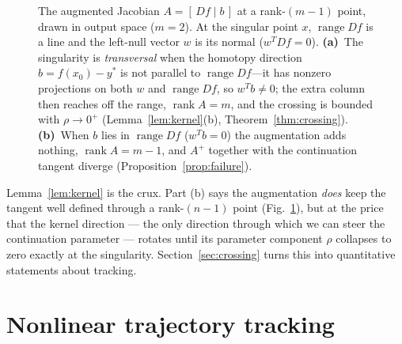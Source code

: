\documentclass[11pt,american]{article}
\DeclareMathOperator{\rank}{\operatorname{rank}}
\DeclareMathOperator{\range}{range}
\theoremstyle{definition}
\theoremstyle{plain}
\theoremstyle{remark}
\begin{document}
\begin{figure}[h]
\begin{tikzpicture}[scale=1.8,line join=round,font=\footnotesize]
\end{tikzpicture}
\caption{The augmented Jacobian $A=[\,Df\mid b\,]$ at a rank-$(m{-}1)$ point, drawn in output space ($m=2$). At the singular point $x$, $\range Df$ is a line and the left-null vector $w$ is its normal ($w^TDf=0$). \textbf{(a)}~The singularity is \emph{transversal} when the homotopy direction $b=f(x_0)-y^*$ is not parallel to $\range Df$---it has nonzero projections on both $w$ and $\range Df$, so $w^Tb\neq0$; the extra column then reaches off the range, $\rank A=m$, and the crossing is bounded with $\rho\to0^{+}$ (Lemma~\ref{lem:kernel}(b), Theorem~\ref{thm:crossing}). \textbf{(b)}~When $b$ lies in $\range Df$ ($w^Tb=0$) the augmentation adds nothing, $\rank A=m-1$, and $A^{+}$ together with the continuation tangent diverge (Proposition~\ref{prop:failure}).}
\label{fig:transversality}
\end{figure}

Lemma~\ref{lem:kernel} is the crux. Part (b) says the augmentation \emph{does} keep the tangent well defined through a rank-$(n-1)$ point (Fig.~\ref{fig:transversality}), but at the price that the kernel direction — the only direction through which we can steer the continuation parameter — rotates until its parameter component $\rho$ collapses to zero exactly at the singularity. Section~\ref{sec:crossing} turns this into quantitative statements about tracking.

\section{Nonlinear trajectory tracking}\label{sec:tracking}
\end{document}

